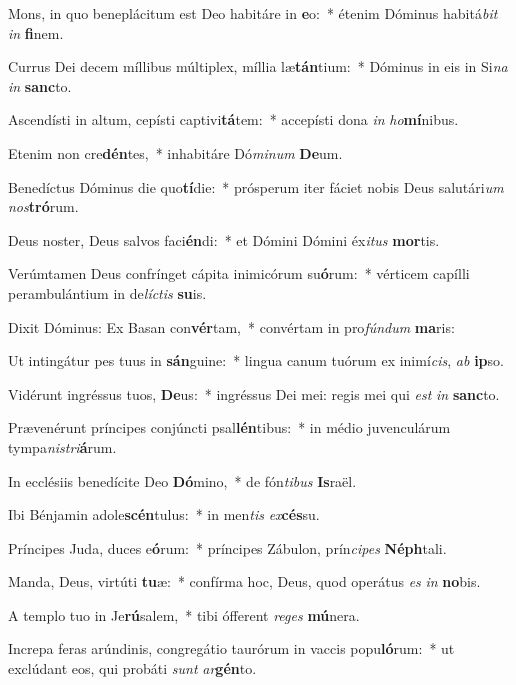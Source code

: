 \item Mons, in quo beneplácitum est Deo habitáre in \textbf{e}o:~* étenim Dóminus habitá\textit{bit} \textit{in} \textbf{fi}nem.
\item Currus Dei decem míllibus múltiplex, míllia læ\textbf{tán}tium:~* Dóminus in eis in Si\textit{na} \textit{in} \textbf{sanc}to.
\item Ascendísti in altum, cepísti captivi\textbf{tá}tem:~* accepísti dona \textit{in} \textit{ho}\textbf{mí}nibus.
\item Etenim non cre\textbf{dén}tes,~* inhabitáre Dó\textit{mi}\textit{num} \textbf{De}um.
\item Benedíctus Dóminus die quo\textbf{tí}die:~* prósperum iter fáciet nobis Deus salutári\textit{um} \textit{nos}\textbf{tró}rum.
\item Deus noster, Deus salvos faci\textbf{én}di:~* et Dómini Dómini éx\textit{i}\textit{tus} \textbf{mor}tis.
\item Verúmtamen Deus confrínget cápita inimicórum su\textbf{ó}rum:~* vérticem capílli perambulántium in de\textit{líc}\textit{tis} \textbf{su}is.
\item Dixit Dóminus: Ex Basan con\textbf{vér}tam,~* convértam in pro\textit{fún}\textit{dum} \textbf{ma}ris:
\item Ut intingátur pes tuus in \textbf{sán}guine:~* lingua canum tuórum ex inimí\textit{cis}, \textit{ab} \textbf{ip}so.
\item Vidérunt ingréssus tuos, \textbf{De}us:~* ingréssus Dei mei: regis mei qui \textit{est} \textit{in} \textbf{sanc}to.
\item Prævenérunt príncipes conjúncti psal\textbf{lén}tibus:~* in médio juvenculárum tympa\textit{nis}\textit{tri}\textbf{á}rum.
\item In ecclésiis benedícite Deo \textbf{Dó}mino,~* de fón\textit{ti}\textit{bus} \textbf{Is}raël.
\item Ibi Bénjamin adole\textbf{scén}tulus:~* in men\textit{tis} \textit{ex}\textbf{cés}su.
\item Príncipes Juda, duces e\textbf{ó}rum:~* príncipes Zábulon, prín\textit{ci}\textit{pes} \textbf{Néph}tali.
\item Manda, Deus, virtúti \textbf{tu}æ:~* confírma hoc, Deus, quod operátus \textit{es} \textit{in} \textbf{no}bis.
\item A templo tuo in Je\textbf{rú}salem,~* tibi ófferent \textit{re}\textit{ges} \textbf{mú}nera.
\item Increpa feras arúndinis, congregátio taurórum in vaccis popu\textbf{ló}rum:~* ut exclúdant eos, qui probáti \textit{sunt} \textit{ar}\textbf{gén}to.
